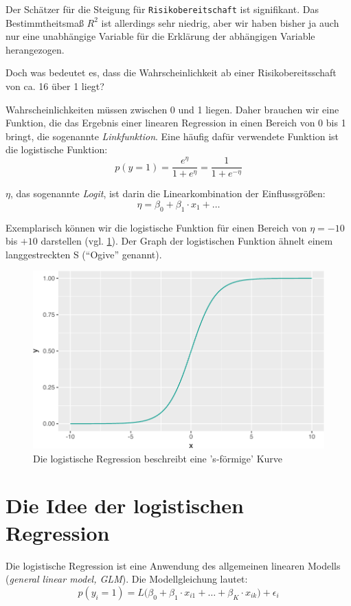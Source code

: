 \documentclass[12pt,ngerman,]{book}
\begin{document}
Der Schätzer für die Steigung für \texttt{Risikobereitschaft} ist
signifikant. Das Bestimmtheitsmaß \(R^2\) ist allerdings sehr niedrig,
aber wir haben bisher ja auch nur eine unabhängige Variable für die
Erklärung der abhängigen Variable herangezogen.

Doch was bedeutet es, dass die Wahrscheinlichkeit ab einer
Risikobereitsschaft von ca. 16 über 1 liegt?

Wahrscheinlichkeiten müssen zwischen 0 und 1 liegen. Daher brauchen wir
eine Funktion, die das Ergebnis einer linearen Regression in einen
Bereich von 0 bis 1 bringt, die sogenannte \emph{Linkfunktion}. Eine
häufig dafür verwendete Funktion ist die logistische Funktion:
\[p(y=1)=\frac{e^\eta}{1+e^\eta}=\frac{1}{1+e^{-\eta}}\]

\(\eta\), das sogenannte \emph{Logit}, ist darin die Linearkombination
der Einflussgrößen: \[\eta=\beta_0+\beta_1\cdot x_1+\dots\]

Exemplarisch können wir die logistische Funktion für einen Bereich von
\(\eta=-10\) bis \(+10\) darstellen (vgl. \ref{fig:logist-curve}). Der
Graph der logistischen Funktion ähnelt einem langgestreckten S
(``Ogive'' genannt).

\begin{figure}

{\centering \includegraphics[width=0.7\linewidth]{072_klassifizierende_Regression_files/figure-latex/logist-curve-1} 

}

\caption{Die logistische Regression beschreibt eine 's-förmige' Kurve}\label{fig:logist-curve}
\end{figure}

\section{Die Idee der logistischen
Regression}\label{die-idee-der-logistischen-regression}

Die logistische Regression ist eine Anwendung des allgemeinen linearen
Modells (\emph{general linear model, GLM}). Die Modellgleichung lautet:
\[p(y_i=1)=L\bigl(\beta_0+\beta_1\cdot x_{i1}+\dots+\beta_K\cdot x_{ik}\bigr)+\epsilon_i\]
\end{document}
